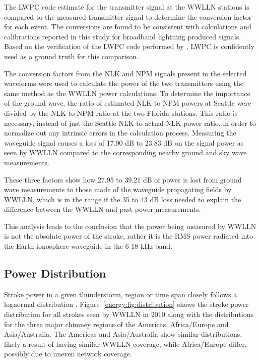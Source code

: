 The LWPC code estimate for the transmitter signal at the WWLLN stations is compared to the measured transmitter signal to determine the conversion factor for each event.
The conversions are found to be consistent with calculations and calibrations reported in this study for broadband lightning produced signals.
Based on the verification of the LWPC code performed by \citet{Thomson2010}, LWPC is confidently used as a ground truth for this comparison.

The conversion factors from the NLK and NPM signals present in the selected waveforms were used to calculate the power of the two transmitters using the same method as the WWLLN power calculations.
To determine the importance of the ground wave, the ratio of estimated NLK to NPM powers at Seattle were divided by the NLK to NPM ratio at the two Florida stations.
This ratio is necessary, instead of just the Seattle NLK to actual NLK power ratio, in order to normalize out any intrinsic errors in the calculation process.
Measuring the waveguide signal causes a loss of 17.90 dB to 23.83 dB on the signal power as seen by WWLLN compared to the corresponding nearby ground and sky wave measurements.

These three factors show how 27.95 to 39.21 dB of power is lost from ground wave measurements to those made of the waveguide propagating fields by WWLLN, which is in the range if the 35 to 43 dB loss needed to explain the difference between the WWLLN and past power measurements.

This analysis leads to the conclusion that the power being measured by WWLLN is not the absolute power of the stroke, rather it is the RMS power radiated into the Earth-ionosphere waveguide in the 6-18 kHz band.

\subsection{Power Distribution}

Stroke power in a given thunderstorm, region or time span closely follows a lognormal distribution \citep{Golde1977}. Figure~\ref{energy:fig:distribution} shows the stroke power distribution for all strokes seen by WWLLN in 2010 along with the distributions for the three major chimney regions of the Americas, Africa/Europe and Asia/Australia.
The Americas and Asia/Australia show similar distributions, likely a result of having similar WWLLN coverage, while Africa/Europe differ, possibly due to uneven network coverage.

